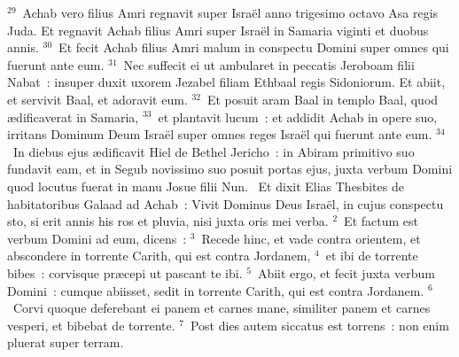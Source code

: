 ${}^{29}$~Achab vero filius Amri regnavit super Isra\"el anno trigesimo octavo Asa regis Juda. Et regnavit Achab filius Amri super Isra\"el in Samaria viginti et duobus annis.
${}^{30}$~Et fecit Achab filius Amri malum in conspectu Domini super omnes qui fuerunt ante eum.
${}^{31}$~Nec suffecit ei ut ambularet in peccatis Jeroboam filii Nabat~: insuper duxit uxorem Jezabel filiam Ethbaal regis Sidoniorum. Et abiit, et servivit Baal, et adoravit eum.
${}^{32}$~Et posuit aram Baal in templo Baal, quod \ae dificaverat in Samaria,
${}^{33}$~et plantavit lucum~: et addidit Achab in opere suo, irritans Dominum Deum Isra\"el super omnes reges Isra\"el qui fuerunt ante eum.
${}^{34}$~In diebus ejus \ae dificavit Hiel de Bethel Jericho~: in Abiram primitivo suo fundavit eam, et in Segub novissimo suo posuit portas ejus, juxta verbum Domini quod locutus fuerat in manu Josue filii Nun.
~\lettrine[lines=10,image=true,loversize=0.05,lraise=-0.03]{E}{}t dixit Elias Thesbites de habitatoribus Galaad ad Achab~: Vivit Dominus Deus Isra\"el, in cujus conspectu sto, si erit annis his ros et pluvia, nisi juxta oris mei verba.
${}^{2}$~Et factum est verbum Domini ad eum, dicens~:
${}^{3}$~Recede hinc, et vade contra orientem, et abscondere in torrente Carith, qui est contra Jordanem,
${}^{4}$~et ibi de torrente bibes~: corvisque pr\ae cepi ut pascant te ibi.
${}^{5}$~Abiit ergo, et fecit juxta verbum Domini~: cumque abiisset, sedit in torrente Carith, qui est contra Jordanem.
${}^{6}$~Corvi quoque deferebant ei panem et carnes mane, similiter panem et carnes vesperi, et bibebat de torrente.
${}^{7}$~Post dies autem siccatus est torrens~: non enim pluerat super terram.


